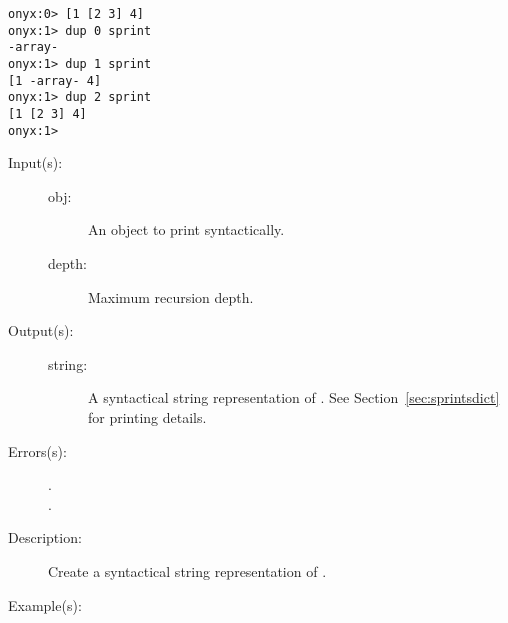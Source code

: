 \begin{description}
\begin{description}
\begin{verbatim}
onyx:0> [1 [2 3] 4]
onyx:1> dup 0 sprint
-array-
onyx:1> dup 1 sprint
[1 -array- 4]
onyx:1> dup 2 sprint
[1 [2 3] 4]
onyx:1>
		\end{verbatim}
	\end{description}
\label{systemdict:sprints}
\item[{\onyxop{obj depth}{sprints}{string}}: ]
	\begin{description}\item[]
	\item[Input(s): ]
		\begin{description}\item[]
		\item[obj: ]
			An object to print syntactically.
		\item[depth: ]
			Maximum recursion depth.
		\end{description}
	\item[Output(s): ]
		\begin{description}\item[]
		\item[string: ]
			A syntactical string representation of .
			See Section~\ref{sec:sprintsdict} for printing details.
		\end{description}
	\item[Errors(s): ]
		\begin{description}\item[]
		\item[.]
		\item[.]
		\end{description}
	\item[Description: ]
		Create a syntactical string representation of .
	\item[Example(s): ]\begin{verbatim}


\end{verbatim}
\end{description}
\end{description}
